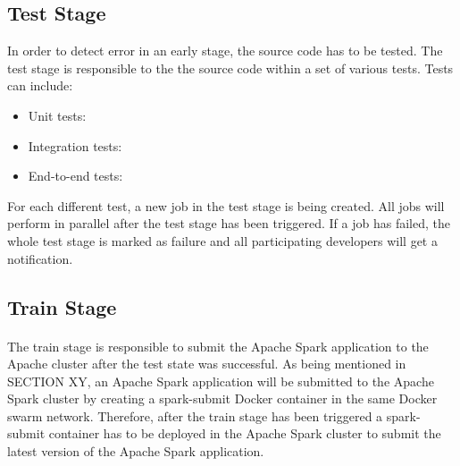 \subsection{Test Stage}
In order to detect error in an early stage, the source code has to be tested.
The test stage is responsible to the the source code within a set of various tests. Tests can include:
\begin{itemize}
\item Unit tests:
\item Integration tests:
\item End-to-end tests:
\end{itemize}
For each different test, a new job in the test stage is being created. All jobs will perform in parallel after the test stage has been triggered.
If a job has failed, the whole test stage is marked as failure and all participating developers will get a notification.


\subsection{Train Stage}
\paragraph{}
The train stage is responsible to submit the Apache Spark application to the Apache cluster after the test state was successful.
As being mentioned in SECTION XY, an Apache Spark application will be submitted to the Apache Spark cluster by creating a spark-submit Docker container in the same Docker swarm network.
Therefore, after the train stage has been triggered a spark-submit container has to be deployed in the Apache Spark cluster to submit the latest version of the Apache Spark application.

